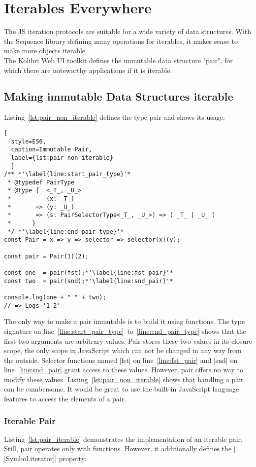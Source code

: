 \section{Iterables Everywhere}
\label{sec:Iterables Everywhere}
The JS iteration protocols are suitable for a wide variety of data structures.
With the Sequence library defining many operations for iterables, it makes
sense to make more objects iterable. \\
The Kolibri Web UI toolkit defines the immutable data structure "pair", for
which there are noteworthy applications if it is iterable.
\subsection{Making immutable Data Structures iterable}
\label{sub:Making immutable Data Structures iterable}
Listing~\ref{lst:pair_non_iterable} defines the type pair and shows its usage:
\begin{lstlisting}[
  style=ES6, 
  caption=Immutable Pair,
  label={lst:pair_non_iterable}
  ]
/** *'\label{line:start_pair_type}'*
 * @typedef PairType
 * @type {  <_T_, _U_>
 *          (x: _T_)
 *       => (y: _U_)
 *       => (s: PairSelectorType<_T_, _U_>) => ( _T_ | _U_ ) 
 *      }
 */ *'\label{line:end_pair_type}'*
const Pair = x => y => selector => selector(x)(y);

const pair = Pair(1)(2);

const one  = pair(fst);*'\label{line:fst_pair}'*
const two  = pair(snd);*'\label{line:snd_pair}'*

console.log(one + " " + two);
// => Logs '1 2'
\end{lstlisting}

The only way to make a pair immutable is to build it using functions. The type 
signature on line~\ref{line:start_pair_type}~to~\ref{line:end_pair_type} shows 
that the first two arguments are arbitrary values. Pair stores these two values
in its closure scope, the only scope in JavaScript which can not be changed in
any way from the outside.
Selector functions named |fst| on line~\ref{line:fst_pair} and |snd| on 
line~\ref{line:snd_pair} grant access to these values. However, pair offers
no way to modify these values. Listing~\ref{lst:pair_non_iterable} shows that
handling a pair can be cumbersome. It would be great to use the built-in
JavaScript language features to access the elements of a pair.

\subsubsection{Iterable Pair}
\label{subsub:Iterable Pair}
Listing~\ref{lst:pair_iterable} demonstrates the implementation of an iterable
pair. Still, pair operates only with functions. However, it additionally
defines the |[Symbol.iterator]| property:


